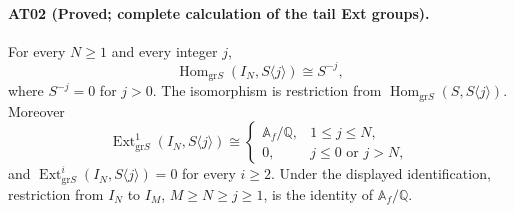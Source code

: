 \paragraph{AT02 (Proved; complete calculation of the tail Ext groups).}
For every $N\geq1$ and every integer $j$,
\[
 \operatorname{Hom}_{\mathrm{gr}S}
       (I_N,S\langle j\rangle)\cong S^{-j},
\]
where $S^{-j}=0$ for $j>0$. The isomorphism is restriction
from $\operatorname{Hom}_{\mathrm{gr}S}(S,S\langle j\rangle)$.
Moreover
\[
 \operatorname{Ext}^1_{\mathrm{gr}S}(I_N,S\langle j\rangle)
 \cong
 \begin{cases}
  \mathbb A_f/\mathbb Q,&1\leq j\leq N,\\
  0,&j\leq0\text{ or }j>N,
 \end{cases}
\]
and $\operatorname{Ext}^i_{\mathrm{gr}S}(I_N,S\langle j\rangle)=0$
for every $i\geq2$. Under the displayed identification, restriction
from $I_N$ to $I_M$, $M\geq N\geq j\geq1$, is the identity of
$\mathbb A_f/\mathbb Q$.

